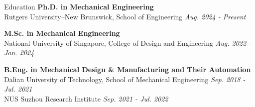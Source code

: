 \documentclass{resume} %
\begin{document}
\begin{rSection}{Education}
{\bf Ph.D. in Mechanical Engineering} \\
Rutgers University–New Brunswick, School of Engineering \hfill {\em Aug. 2024 - Present}\\	

\vspace{-1em}

{\bf M.Sc. in Mechanical Engineering} \\
National University of Singapore, College of Design and Engineering \hfill {\em Aug. 2022 - Jan. 2024}\\

\vspace{-1em}

{\bf B.Eng. in Mechanical Design \& Manufacturing and Their Automation} \\
Dalian University of Technology, School of Mechanical Engineering \hfill {\em Sep. 2018 - Jul. 2021}\\
NUS Suzhou Research Institute
\hfill {\em Sep. 2021 - Jul. 2022}\\
\end{rSection}

\vspace{-1em}


\end{document}
